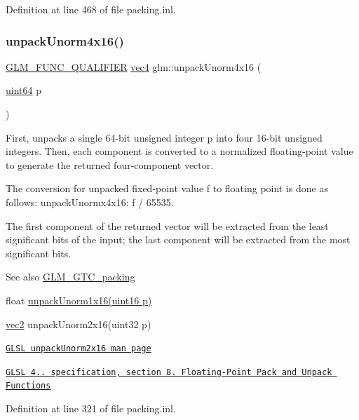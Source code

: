 Definition at line 468 of file packing.\+inl.

\mbox{\label{group__gtc__packing_gafb2b502bc406031a5618ce930139a9e3}} 
\subsubsection{\texorpdfstring{unpack\+Unorm4x16()}{unpackUnorm4x16()}}
{\footnotesize\ttfamily \hyperlink{setup_8hpp_a33fdea6f91c5f834105f7415e2a64407}{G\+L\+M\+\_\+\+F\+U\+N\+C\+\_\+\+Q\+U\+A\+L\+I\+F\+I\+ER} \hyperlink{group__core__types_ga5881b1b022d7fd1b7218f5916532dd02}{vec4} glm\+::unpack\+Unorm4x16 (\begin{DoxyParamCaption}\item[{\hyperlink{group__gtc__type__precision_gae3632bf9b37da66233d78930dd06378a}{uint64}}]{p }\end{DoxyParamCaption})}

First, unpacks a single 64-\/bit unsigned integer p into four 16-\/bit unsigned integers. Then, each component is converted to a normalized floating-\/point value to generate the returned four-\/component vector.

The conversion for unpacked fixed-\/point value f to floating point is done as follows\+: unpack\+Unormx4x16\+: f / 65535.

The first component of the returned vector will be extracted from the least significant bits of the input; the last component will be extracted from the most significant bits.

\begin{DoxySeeAlso}{See also}
\hyperlink{group__gtc__packing}{G\+L\+M\+\_\+\+G\+T\+C\+\_\+packing} 

float \hyperlink{group__gtc__packing_ga7770e3ade4f4764cc1b2eb42ac4ec188}{unpack\+Unorm1x16(uint16 p)} 

\hyperlink{group__core__types_gaa1618f51db67eaa145db101d8c8431d8}{vec2} unpack\+Unorm2x16(uint32 p) 

\href{http://www.opengl.org/sdk/docs/manglsl/xhtml/unpackUnorm2x16.xml}{\tt G\+L\+SL unpack\+Unorm2x16 man page} 

\href{http://www.opengl.org/registry/doc/GLSLangSpec.4.20.8.pdf}{\tt G\+L\+SL 4.. specification, section 8. Floating-\/\+Point Pack and Unpack Functions} 
\end{DoxySeeAlso}


Definition at line 321 of file packing.\+inl.


